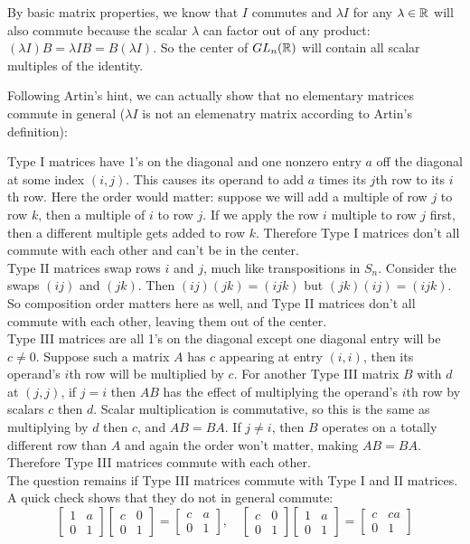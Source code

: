 \documentclass{article}
\begin{document}
By basic matrix properties, we know that $I$ commutes and $\lambda I$ for any $\lambda \in \mathbb{R}$ will also commute because the scalar $\lambda$ can factor out of any product: $(\lambda I)B = \lambda IB = B(\lambda I)$. So the center of $GL_n(\mathbb{R})$ will contain all scalar multiples of the identity.

Following Artin's hint, we can actually show that no elementary matrices commute in general ($\lambda I$ is not an elemenatry matrix according to Artin's definition):

Type I matrices have 1's on the diagonal and one nonzero entry $a$ off the diagonal at some index $(i, j)$. This causes its operand to add $a$ times its $j$th row to its $i$th row. Here the order would matter: suppose we will add a multiple of row $j$ to row $k$, then a multiple of $i$ to row $j$. If we apply the row $i$ multiple to row $j$ first, then a different multiple gets added to row $k$. Therefore Type I matrices don't all commute with each other and can't be in the center.
\\

Type II matrices swap rows $i$ and $j$, much like transpositions in $S_n$. Consider the swaps $(ij)$ and $(jk)$. Then $(ij)(jk) = (ijk)$ but $(jk)(ij) = (ijk)$. So composition order matters here as well, and Type II matrices don't all commute with each other, leaving them out of the center.
\\

Type III matrices are all 1's on the diagonal except one diagonal entry will be $c \neq 0$. Suppose such a matrix $A$ has $c$ appearing at entry $(i, i)$, then its operand's $i$th row will be multiplied by $c$.  For another Type III matrix $B$ with $d$ at $(j, j)$, if $j = i$ then $AB$ has the effect of multiplying the operand's $i$th row by scalars $c$ then $d$. Scalar multiplication is commutative, so this is the same as multiplying by $d$ then $c$, and $AB = BA$. If $j \neq i$, then $B$ operates on a totally different row than $A$ and again the order won't matter, making $AB = BA$. Therefore Type III matrices commute with each other.
\\

The question remains if Type III matrices commute with Type I and II matrices. A quick check shows that they do not in general commute:
$$\begin{bmatrix}1 & a \\ 0 & 1 \end{bmatrix}\begin{bmatrix}c & 0 \\ 0 & 1\end{bmatrix} = \begin{bmatrix}c& a \\ 0 & 1\end{bmatrix}, \quad \begin{bmatrix}c & 0 \\ 0 & 1\end{bmatrix}\begin{bmatrix}1 & a \\ 0 & 1 \end{bmatrix} = \begin{bmatrix} c & ca \\ 0 & 1\end{bmatrix}$$
\end{document}
